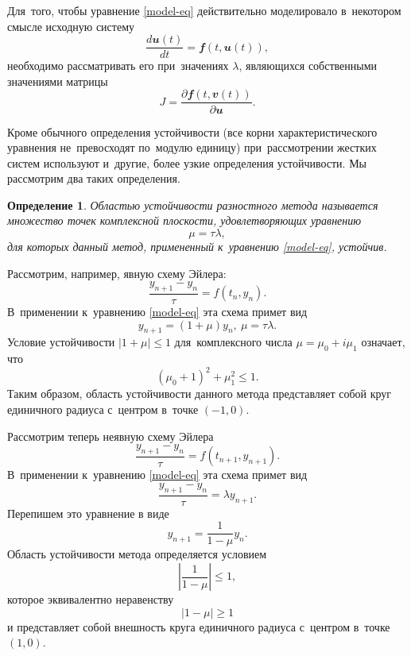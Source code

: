\documentclass[11pt,a4paper,twoside]{report}
\numberwithin{equation}{section}
\newtheorem*{definition}{Определение}
\theoremstyle{definition}
\theoremstyle{plain}
\newcommand{\vfunc}[1]{\mathbfit{#1}}
\begin{document}
Для~того, чтобы уравнение \eqref{model-eq} действительно моделировало в~некотором
смысле исходную систему
%
$$
    \dfrac{d\vfunc{u}(t)}{dt}=\vfunc{f}(t, \vfunc{u}(t)),
$$
%
необходимо рассматривать его при~значениях $\lambda$, являющихся собственными
значениями матрицы
%
$$
    J=\dfrac{\partial\vfunc{f}(t,\vfunc{v}(t))}{\partial\vfunc{u}}.
$$
%

Кроме обычного определения устойчивости (все корни характеристического уравнения
не~превосходят по~модулю единицу) при~рассмотрении жестких систем используют
и~другие, более узкие определения устойчивости. Мы рассмотрим два таких определения.

\begin{definition}
    Областью устойчивости разностного метода называется множество точек
    комплексной плоскости, удовлетворяющих уравнению
    $$
        \mu = \tau\lambda,
    $$
    для которых данный метод, примененный к~уравнению \eqref{model-eq}, устойчив.
\end{definition}

Рассмотрим, например, явную схему Эйлера:
%
$$
    \dfrac{y_{n+1}-y_n}{\tau} = f(t_n, y_n).
$$
%
В~применении к~уравнению \eqref{model-eq} эта схема примет вид
%
$$
    y_{n+1}=\left(1+\mu\right)y_n,~\mu=\tau\lambda.
$$
%
Условие устойчивости $|1+\mu|\leqslant 1$ для~комплексного числа
$\mu=\mu_0+i\mu_1$ означает, что
%
$$
    (\mu_0+1)^2+\mu_1^2\leqslant 1.
$$
%
Таким образом, область устойчивости данного метода представляет собой круг
единичного радиуса с~центром в~точке $(-1, 0)$.

%
\begin{figure}[H]
    \centering
\end{figure}
%

Рассмотрим теперь неявную схему Эйлера
%
$$
    \dfrac{y_{n+1}-y_n}{\tau}=f(t_{n+1}, y_{n+1}).
$$
%
В~применении к~уравнению \eqref{model-eq} эта схема примет вид
%
$$
    \dfrac{y_{n+1}-y_n}{\tau} = \lambda y_{n+1}.
$$
%
Перепишем это уравнение в виде
%
$$
    y_{n+1}=\dfrac{1}{1-\mu}y_n.
$$
%
Область устойчивости метода определяется условием
%
$$
    \left|\dfrac{1}{1-\mu}\right|\leqslant 1,
$$
%
которое эквивалентно неравенству
%
$$
    \left|1-\mu\right|\geqslant 1
$$
%
и представляет собой внешность круга единичного радиуса с~центром в~точке
$(1, 0)$.
\end{document}

